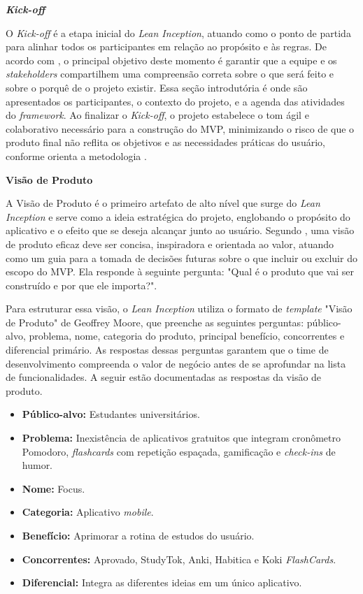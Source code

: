 \textbf{\textit{Kick-off}}

O \textit{Kick-off} é a etapa inicial do \textit{Lean Inception}, atuando como o ponto de partida para alinhar todos os participantes em relação ao propósito e às regras.
De acordo com , o principal objetivo deste momento é garantir que a equipe e os \textit{stakeholders} compartilhem uma compreensão correta sobre o que será feito e sobre o porquê de o projeto existir.
Essa seção introdutória é onde são apresentados os participantes, o contexto do projeto, e a agenda das atividades do \textit{framework}. Ao finalizar o \textit{Kick-off}, o projeto estabelece o tom ágil e colaborativo necessário para a construção do MVP, minimizando o risco de que o produto final não reflita os objetivos e as necessidades práticas do usuário, conforme orienta a metodologia \cite{caroli_2017}.

\textbf{Visão de Produto}

A Visão de Produto é o primeiro artefato de alto nível que surge do \textit{Lean Inception} e serve como a ideia estratégica do projeto, englobando o propósito do aplicativo e o efeito que se deseja alcançar junto ao usuário.
Segundo , uma visão de produto eficaz deve ser concisa, inspiradora e orientada ao valor, atuando como um guia para a tomada de decisões futuras sobre o que incluir ou excluir do escopo do MVP.
Ela responde à seguinte pergunta: "Qual é o produto que vai ser construído e por que ele importa?".

Para estruturar essa visão, o \textit{Lean Inception} utiliza o formato de \textit{template} "Visão de Produto" de Geoffrey Moore, que preenche as seguintes perguntas: público-alvo, problema, nome, categoria do produto, principal benefício, concorrentes e diferencial primário.
As respostas dessas perguntas garantem que o time de desenvolvimento compreenda o valor de negócio antes de se aprofundar na lista de funcionalidades.
A seguir estão documentadas as respostas da visão de produto.

\begin{itemize}
    \item \textbf{Público-alvo:} Estudantes universitários.
    \item \textbf{Problema:} Inexistência de aplicativos gratuitos que integram cronômetro Pomodoro, \textit{flashcards} com repetição espaçada, gamificação e \textit{check-ins} de humor.
    \item \textbf{Nome:} Focus.
    \item \textbf{Categoria:} Aplicativo \textit{mobile}.
    \item \textbf{Benefício:} Aprimorar a rotina de estudos do usuário.
    \item \textbf{Concorrentes:} Aprovado, StudyTok, Anki, Habitica e Koki \textit{FlashCards}.
    \item \textbf{Diferencial:} Integra as diferentes ideias em um único aplicativo.
\end{itemize}

